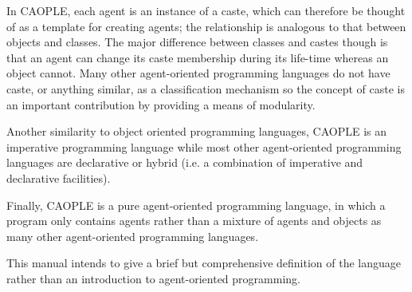 In CAOPLE, each agent is an instance of a caste, which can therefore
be thought of as a template for creating agents; the relationship
is analogous to that between objects and classes. The major difference
between classes and castes though is that an agent can change its
caste membership during its life-time whereas an object cannot. 
Many other agent-oriented
programming languages do not have caste, or anything similar, as a
classification mechanism so the concept of caste is an important contribution
by providing a means of modularity. 

Another similarity to object oriented programming languages, CAOPLE is 
an imperative programming language while most other agent-oriented 
programming languages are declarative or hybrid (i.e. a combination of 
imperative and declarative facilities). 

Finally, CAOPLE is a pure agent-oriented programming language, in which 
a program only contains agents rather than a mixture of agents and 
objects as many other agent-oriented programming languages. 

This manual intends to give a brief but comprehensive definition of the language 
rather than an introduction to agent-oriented programming. 

